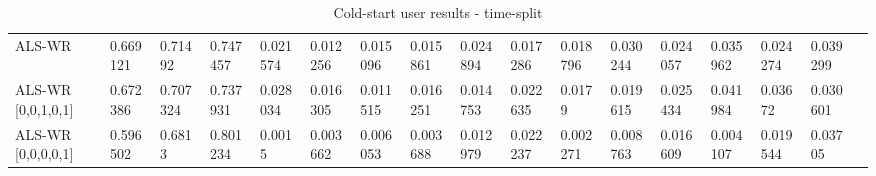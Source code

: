 \begin{table}[H]
{\begin{tabular}{*{17}{l}}
\rowcolor{Gray}
ALS-WR &	0.669121	&	0.71492	&	0.747457	&	0.021574	&	0.012256	&	0.015096	&	0.015861	&	0.024894	&	0.017286	&	0.018796	&	0.030244	&	0.024057	&	0.035962	&	0.024274	&	0.039299	&	\\															
ALS-WR [0,0,1,0,1] & 0.672386	&	0.707324	&	0.737931	&	0.028034	&	0.016305	&	0.011515	&	0.016251	&	0.014753	&	0.022635	&	0.0179	&	0.019615	&	0.025434	&	0.041984	&	0.03672	&	0.030601 & \\
																													
ALS-WR [0,0,0,0,1]&	0.596502	&	0.6813	&	0.801234	&	0.0015	&	0.003662	&	0.006053	&	0.003688	&	0.012979	&	0.022237	&	0.002271	&	0.008763	&	0.016609	&	0.004107	&	0.019544	&	0.03705	& \\


\bottomrule
\end{tabular}
}
\caption{Cold-start user results -  time-split}
\end{table}


